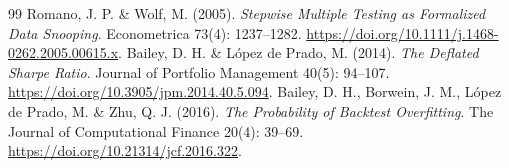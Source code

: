 \begin{thebibliography}{99}
 Romano, J. P. \& Wolf, M. (2005). \emph{Stepwise Multiple Testing as Formalized Data Snooping}. Econometrica 73(4): 1237--1282. \href{https://doi.org/10.1111/j.1468-0262.2005.00615.x}{https://doi.org/10.1111/j.1468-0262.2005.00615.x}.
 Bailey, D. H. \& López de Prado, M. (2014). \emph{The Deflated Sharpe Ratio}. Journal of Portfolio Management 40(5): 94--107. \href{https://doi.org/10.3905/jpm.2014.40.5.094}{https://doi.org/10.3905/jpm.2014.40.5.094}.
 Bailey, D. H., Borwein, J. M., López de Prado, M. \& Zhu, Q. J. (2016). \emph{The Probability of Backtest Overfitting}. The Journal of Computational Finance 20(4): 39--69. \href{https://doi.org/10.21314/jcf.2016.322}{https://doi.org/10.21314/jcf.2016.322}.
\end{thebibliography}
